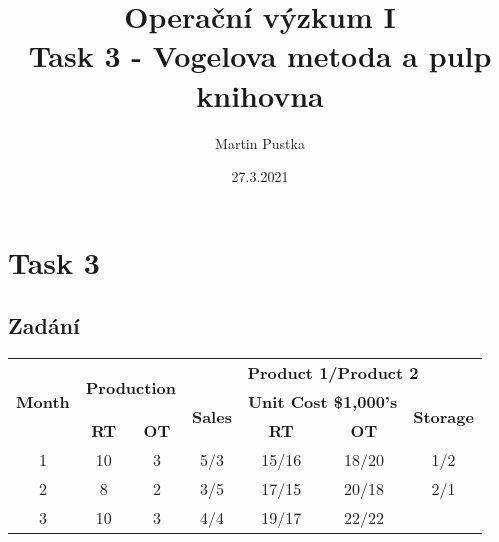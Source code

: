 \documentclass{article}%
\title{Operační výzkum I\\
    \large Task 3 - Vogelova metoda a pulp knihovna}
\date{27.3.2021}
\author{Martin Pustka}
\begin{document}
\maketitle
\newpage

\section{Task 3}

\subsection{Zadání}
\begin{tabular}{|c|cc|c c c c|}
    \multirow{3}{*}{\textbf{Month}} & \multicolumn{2}{c}{\multirow{2}{*}{\textbf{Production}}} & \multicolumn{4}{c}{\textbf{Product 1/Product 2}}                                                                                                      \\
                                    & &                                                   & \multirow{2}{*}{\textbf{Sales}} & \multicolumn{2}{c}{\textbf{Unit Cost \$1,000’s}} & \multirow{2}{*}{\textbf{Storage}} \\
                                    & \textbf{RT}                         & \textbf{OT}                        &                                 & \textbf{RT}                      & \textbf{OT}                     &                                                \\
    1                               & 10                                  & 3                                  & 5/3                             & 15/16                            & 18/20                           & 1/2                                            \\
    2                               & 8                                   & 2                                  & 3/5                             & 17/15                            & 20/18                           & 2/1                                            \\
    3                               & 10                                  & 3                                  & 4/4                             & 19/17                            & 22/22                           &                                               
    \end{tabular}
\end{document}
